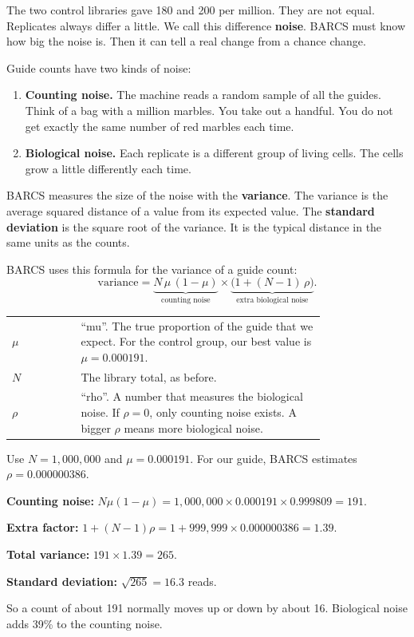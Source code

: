 \documentclass[12pt]{article}
\begin{document}
The two control libraries gave 180 and 200 per million. They are not equal.
Replicates always differ a little. We call this difference
\textbf{noise}. BARCS must know how big the noise is. Then it can tell a
real change from a chance change.

Guide counts have two kinds of noise:

\begin{enumerate}
\item \textbf{Counting noise.} The machine reads a random sample of all
  the guides. Think of a bag with a million marbles. You take out a handful.
  You do not get exactly the same number of red marbles each time.
\item \textbf{Biological noise.} Each replicate is a different group of
  living cells. The cells grow a little differently each time.
\end{enumerate}

BARCS measures the size of the noise with the \textbf{variance}. The
variance is the average squared distance of a value from its expected
value. The \textbf{standard deviation} is the square root of the variance.
It is the typical distance in the same units as the counts.

BARCS uses this formula for the variance of a guide count:
\[
\text{variance} = \underbrace{N\,\mu\,(1-\mu)}_{\text{counting noise}}
 \times \underbrace{\bigl(1 + (N-1)\,\rho\bigr)}_{\text{extra biological noise}}.
\]

\begin{symbols}
\begin{tabular}{@{}l p{0.78\linewidth}@{}}
$\mu$ & ``mu''. The true proportion of the guide that we expect. For the
        control group, our best value is $\mu = 0.000191$.\\
$N$ & The library total, as before.\\
$\rho$ & ``rho''. A number that measures the biological noise. If
         $\rho = 0$, only counting noise exists. A bigger $\rho$ means more
         biological noise.\\
\end{tabular}
\end{symbols}

\begin{worked}[ 4: variance]
Use $N = 1{,}000{,}000$ and $\mu = 0.000191$. For our guide, BARCS
estimates $\rho = 0.000000386$.

\textbf{Counting noise:}
$N\mu(1-\mu) = 1{,}000{,}000 \times 0.000191 \times 0.999809 = 191$.

\textbf{Extra factor:}
$1 + (N-1)\rho = 1 + 999{,}999 \times 0.000000386 = 1.39$.

\textbf{Total variance:} $191 \times 1.39 = 265$.

\textbf{Standard deviation:} $\sqrt{265} = 16.3$ reads.

So a count of about 191 normally moves up or down by about 16. Biological
noise adds 39\% to the counting noise.
\end{worked}
\end{document}
